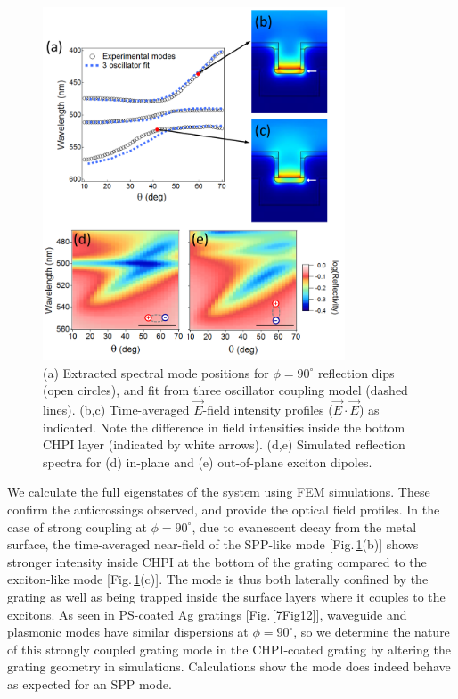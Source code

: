 \begin{figure}[h] 
\centering    
\includegraphics[width=0.8\textwidth]{Fig18}
\caption{(a) Extracted spectral mode positions for $\phi=90^{\circ}$ reflection dips (open circles), and fit from three oscillator coupling model (dashed lines). (b,c) Time-averaged $\vec{E}$-field intensity profiles ($\vec{E}\cdot\vec{E}$) as indicated. %
Note the difference in field intensities inside the bottom CHPI layer (indicated by white arrows). %
(d,e) Simulated reflection spectra for (d) in-plane and (e) out-of-plane exciton dipoles.}
\label{7Fig18}
\end{figure}
\linebreak

We calculate the full eigenstates of the system using FEM simulations. These confirm the anticrossings observed, and provide the optical field profiles.
In the case of strong coupling at $\phi=90^{\circ}$, %
due to evanescent decay from the metal surface, the time-averaged near-field of the SPP-like mode [Fig.\,\ref{7Fig18}(b)] shows stronger intensity inside CHPI at the bottom of the grating compared to the exciton-like mode [Fig.\,\ref{7Fig18}(c)]. %
The mode is thus both laterally confined by the grating as well as being trapped inside the surface layers where it couples to the excitons. %
As seen in PS-coated Ag gratings [Fig.\,\ref{7Fig12}], waveguide and plasmonic modes have similar dispersions at $\phi=90^{\circ}$, so we determine the nature of this strongly coupled grating mode in the CHPI-coated grating by altering the grating geometry in simulations. Calculations show the mode does indeed behave as expected for an SPP mode. %


